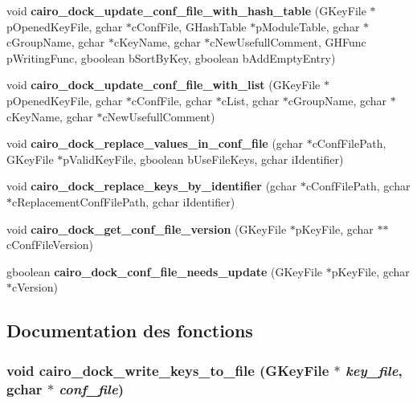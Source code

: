 \begin{CompactItemize}
void {\bf cairo\_\-dock\_\-update\_\-conf\_\-file\_\-with\_\-hash\_\-table} (GKeyFile $\ast$pOpenedKeyFile, gchar $\ast$cConfFile, GHashTable $\ast$pModuleTable, gchar $\ast$cGroupName, gchar $\ast$cKeyName, gchar $\ast$cNewUsefullComment, GHFunc pWritingFunc, gboolean bSortByKey, gboolean bAddEmptyEntry)
\item 
void {\bf cairo\_\-dock\_\-update\_\-conf\_\-file\_\-with\_\-list} (GKeyFile $\ast$pOpenedKeyFile, gchar $\ast$cConfFile, gchar $\ast$cList, gchar $\ast$cGroupName, gchar $\ast$cKeyName, gchar $\ast$cNewUsefullComment)
\item 
void {\bf cairo\_\-dock\_\-replace\_\-values\_\-in\_\-conf\_\-file} (gchar $\ast$cConfFilePath, GKeyFile $\ast$pValidKeyFile, gboolean bUseFileKeys, gchar iIdentifier)
\item 
void {\bf cairo\_\-dock\_\-replace\_\-keys\_\-by\_\-identifier} (gchar $\ast$cConfFilePath, gchar $\ast$cReplacementConfFilePath, gchar iIdentifier)
\item 
void {\bf cairo\_\-dock\_\-get\_\-conf\_\-file\_\-version} (GKeyFile $\ast$pKeyFile, gchar $\ast$$\ast$cConfFileVersion)
\item 
gboolean {\bf cairo\_\-dock\_\-conf\_\-file\_\-needs\_\-update} (GKeyFile $\ast$pKeyFile, gchar $\ast$cVersion)
\end{CompactItemize}


\subsection{Documentation des fonctions}
\subsubsection{\setlength{\rightskip}{0pt plus 5cm}void cairo\_\-dock\_\-write\_\-keys\_\-to\_\-file (GKeyFile $\ast$ {\em key\_\-file}, gchar $\ast$ {\em conf\_\-file})}\label{cairo-dock-keyfile-manager_8h_aaa94db45ddc28158e057ed71ae0b6d4}


